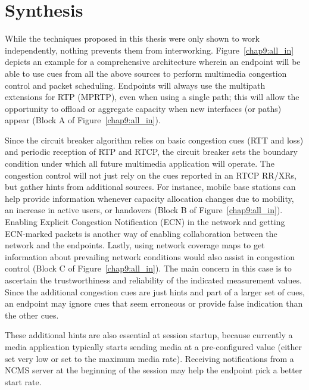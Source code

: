 \section{Synthesis}

While the techniques proposed in this thesis were only shown to work
independently, nothing prevents them from interworking.
Figure~\ref{chap9:all_in} depicts an example for a comprehensive architecture
wherein an endpoint will be able to use cues from all the above sources to
perform multimedia congestion control and packet scheduling. Endpoints will
always use the multipath extensions for RTP (MPRTP), even when using a single
path; this will allow the opportunity to offload or aggregate capacity when
new interfaces (or paths) appear (Block A of Figure~\ref{chap9:all_in}).

Since the circuit breaker algorithm relies on basic congestion cues (RTT and
loss) and periodic reception of RTP and RTCP, the circuit breaker sets the
boundary condition under which all future multimedia application will operate.
The congestion control will not just rely on the cues reported in an RTCP
RR/XRs, but gather hints from additional sources. For instance, mobile base
stations can help provide information whenever capacity allocation changes due
to mobility, an increase in active users, or handovers (Block B of
Figure~\ref{chap9:all_in}). Enabling Explicit Congestion Notification (ECN) in
the network and getting ECN-marked packets is another way of enabling
collaboration between the network and the endpoints. Lastly, using network
coverage maps to get information about prevailing network conditions would
also assist in congestion control (Block C of Figure~\ref{chap9:all_in}).
The main concern in this case is to ascertain the trustworthiness and
reliability of the indicated measurement values. Since the additional
congestion cues are just hints and part of a larger set of cues, an endpoint
may ignore cues that seem erroneous or provide false indication than the other
cues. 


These additional hints are also essential at session
startup, because currently a media application typically starts sending media
at a pre-configured value (either set very low or set to the maximum media
rate). Receiving notifications from a NCMS server at the beginning of the
session may help the endpoint pick a better start rate.


